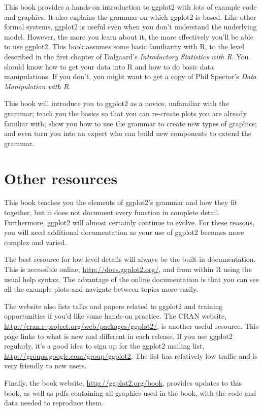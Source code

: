 This book provides a hands-on introduction to ggplot2 with lots of
example code and graphics. It also explains the grammar on which ggplot2
is based. Like other formal systems, ggplot2 is useful even when you
don't understand the underlying model. However, the more you learn about
it, the more effectively you'll be able to use ggplot2. This book
assumes some basic familiarity with R, to the level described in the
first chapter of Dalgaard's \emph{Introductory Statistics with R}. You
should know how to get your data into R and how to do basic data
manipulations. If you don't, you might want to get a copy of Phil
Spector's \emph{Data Manipulation with R}.

This book will introduce you to ggplot2 as a novice, unfamiliar with the
grammar; teach you the basics so that you can re-create plots you are
already familiar with; show you how to use the grammar to create new
types of graphics; and even turn you into an expert who can build new
components to extend the grammar.

\section{Other resources}\label{sec:other-resources}

This book teaches you the elements of ggplot2's grammar and how they fit
together, but it does not document every function in complete detail.
Furthermore, ggplot2 will almost certainly continue to evolve. For these
reasons, you will need additional documentation as your use of ggplot2
becomes more complex and varied.

The best resource for low-level details will always be the built-in
documentation. This is accessible online,
\url{http://docs.ggplot2.org/}, and from within R using the usual help
syntax. The advantage of the online documentation is that you can see
all the example plots and navigate between topics more easily.

The website also lists talks and papers related to ggplot2 and training
opportunities if you'd like some hands-on practice. The CRAN website,
\url{http://cran.r-project.org/web/packages/ggplot2/}, is another useful
resource. This page links to what is new and different in each release.
If you use ggplot2 regularly, it's a good idea to sign up for the
ggplot2 mailing list, \url{http://groups.google.com/group/ggplot2}. The
list has relatively low traffic and is very friendly to new users.

Finally, the book website, \url{http://ggplot2.org/book}, provides
updates to this book, as well as pdfs containing all graphics used in
the book, with the code and data needed to reproduce them.

